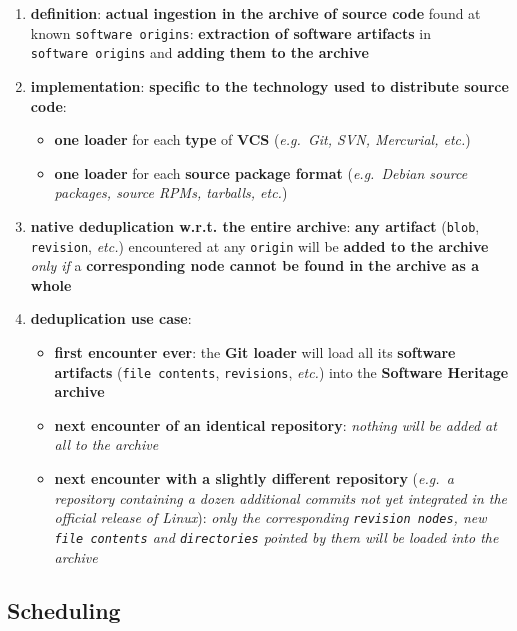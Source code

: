 \documentclass[11pt]{article}
\providecommand{\tightlist}{%
      \setlength{\itemsep}{0pt}\setlength{\parskip}{0pt}}
\begin{document}
\begin{enumerate}
\def\labelenumi{\arabic{enumi}.}
\tightlist
\item
  \textbf{definition}: \textbf{actual ingestion in the archive of source
  code} found at known \texttt{software\ origins}: \textbf{extraction of
  software artifacts} in \texttt{software\ origins} and \textbf{adding
  them to the archive}
\item
  \textbf{implementation}: \textbf{specific to the technology used to
  distribute source code}:

  \begin{itemize}
  \tightlist
  \item
    \textbf{one loader} for each \textbf{type} of \textbf{VCS}
    (\emph{e.g.~Git, SVN, Mercurial, etc.})
  \item
    \textbf{one loader} for each \textbf{source package format}
    (\emph{e.g.~Debian source packages, source RPMs, tarballs, etc.})
  \end{itemize}
\item
  \textbf{native deduplication w.r.t. the entire archive}: \textbf{any
  artifact} (\texttt{blob}, \texttt{revision}, \emph{etc.}) encountered
  at any \texttt{origin} will be \textbf{added to the archive}
  \emph{only if} a \textbf{corresponding node cannot be found in the
  archive as a whole}
\item
  \textbf{deduplication use case}:

  \begin{itemize}
  \tightlist
  \item
    \textbf{first encounter ever}: the \textbf{Git loader} will load all
    its \textbf{software artifacts} (\texttt{file\ contents},
    \texttt{revisions}, \emph{etc.}) into the \textbf{Software Heritage
    archive}
  \item
    \textbf{next encounter of an identical repository}: \emph{nothing
    will be added at all to the archive}
  \item
    \textbf{next encounter with a slightly different repository}
    (\emph{e.g.~a repository containing a dozen additional commits not
    yet integrated in the official release of Linux}): \emph{only the
    corresponding \texttt{revision\ nodes}, new \texttt{file\ contents}
    and \texttt{directories} pointed by them will be loaded into the
    archive}
  \end{itemize}
\end{enumerate}

\hypertarget{scheduling}{%
\subsection{Scheduling}\label{scheduling}}
\end{document}
